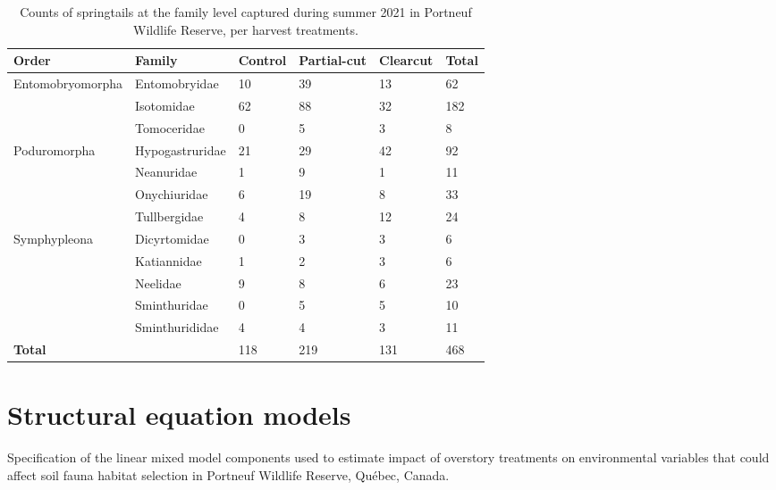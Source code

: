  \begin{table}[ht]
    \centering
    \caption[Counts of springtails at the family level, per harvest treatments]
    {Counts of springtails at the family level captured during summer 2021 in Portneuf Wildlife Reserve, per harvest treatments.}
    \label{tab:springtail}
    \begin{tabular}{llllll} 
        \hline
        Order & Family & Control & Partial-cut & Clearcut & Total \\ [0.5ex] 
        \hline      
        Entomobryomorpha    & Entomobryidae     & 10 & 39 & 13 & 62 \\  
                            & Isotomidae        & 62 & 88 & 32 & 182 \\
                            & Tomoceridae       & 0 & 5 & 3 & 8 \\
        Poduromorpha        & Hypogastruridae   & 21 & 29 & 42 & 92 \\
                            & Neanuridae        & 1 & 9 & 1 & 11 \\
                            & Onychiuridae      & 6 & 19 & 8 & 33 \\
                            & Tullbergidae      & 4 & 8 & 12 & 24 \\
        Symphypleona        & Dicyrtomidae      & 0 & 3 & 3 & 6 \\
                            & Katiannidae       & 1 & 2 & 3 & 6 \\
                            & Neelidae          & 9 & 8 & 6 & 23 \\
                            & Sminthuridae      & 0 & 5 & 5 & 10 \\
                            & Sminthurididae    & 4 & 4 & 3 & 11 \\
                            \hline 
        \textbf{Total}      &                   & 118 & 219 & 131 & 468 \\
        \hline
    \end{tabular}
  \end{table}

\clearpage

\section{Structural equation models}


\begin{table}[h!]
\caption[Specification of the linear mixed model components used to estimate impact of overstory treatments on environmental variables that could affect soil fauna habitat selection.]
{Specification of the linear mixed model components used to estimate impact of overstory treatments on environmental variables that could affect soil fauna habitat selection in Portneuf Wildlife Reserve, Québec, Canada.}
\label{ann:SEM_Env_eq}
\end{table}

